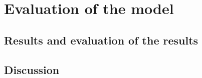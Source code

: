 

\section{Evaluation of the model}

\subsection{Results and evaluation of the results}

\subsection{Discussion}
